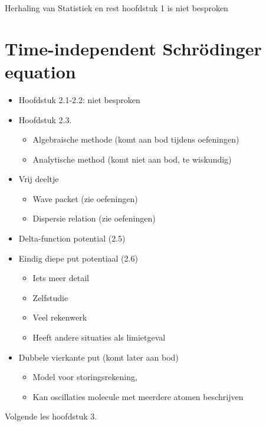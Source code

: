 \documentclass[dutch,course]{lecture}
\begin{document}
Herhaling van Statistiek en rest hoofdstuk 1 is niet besproken


\section{Time-independent Schr\"odinger equation}

\begin{itemize}

\item
  Hoofdstuk 2.1-2.2: niet besproken
\item
  Hoofdstuk 2.3.
  \begin{itemize}
\item
  Algebraische methode (komt aan bod tijdens oefeningen)
\item
  Analytische method (komt niet aan bod, te wiskundig)
  \end{itemize}
\item
  Vrij deeltje
  \begin{itemize}
\item
  Wave packet (zie oefeningen)
\item
  Dispersie relation (zie oefeningen)
\end{itemize}
\item
  Delta-function potential (2.5)
\item
  Eindig diepe put potentiaal (2.6)
  \begin{itemize}
\item
  Iets meer detail
\item
  Zelfstudie
\item
  Veel rekenwerk
\item
  Heeft andere situaties als limietgeval
  \end{itemize}
\item

  Dubbele vierkante put (komt later aan bod)
  \begin{itemize}
\item
  Model voor storingsrekening,
\item
  Kan oscillaties molecule met meerdere atomen beschrijven
  \end{itemize}
\end{itemize}

Volgende les hoofdstuk 3.








\end{document}
